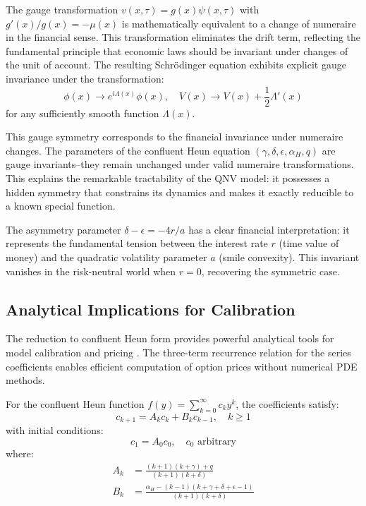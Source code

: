 \documentclass[a4paper,11pt]{article}
\begin{document}
The gauge transformation $v(x, \tau) = g(x)\psi(x, \tau)$ with $g'(x)/g(x) = -\mu(x)$ is mathematically equivalent to a change of numeraire in the financial sense. This transformation eliminates the drift term, reflecting the fundamental principle that economic laws should be invariant under changes of the unit of account. The resulting Schrödinger equation exhibits explicit gauge invariance under the transformation:
\begin{equation}
\phi(x) \rightarrow e^{i\Lambda(x)}\phi(x), \quad V(x) \rightarrow V(x) + \frac{1}{2}\Lambda'(x)
\end{equation}
for any sufficiently smooth function $\Lambda(x)$.

This gauge symmetry corresponds to the financial invariance under numeraire changes. The parameters of the confluent Heun equation $(\gamma, \delta, \epsilon, \alpha_H, q)$ are gauge invariants--they remain unchanged under valid numeraire transformations. This explains the remarkable tractability of the QNV model: it possesses a hidden symmetry that constrains its dynamics and makes it exactly reducible to a known special function.

The asymmetry parameter $\delta - \epsilon = -4r/a$ has a clear financial interpretation: it represents the fundamental tension between the interest rate $r$ (time value of money) and the quadratic volatility parameter $a$ (smile convexity). This invariant vanishes in the risk-neutral world when $r = 0$, recovering the symmetric case.

\subsection{Analytical Implications for Calibration}

The reduction to confluent Heun form provides powerful analytical tools for model calibration and pricing \cite{AlbaneseEtAl2001,Gatheral2006}. The three-term recurrence relation for the series coefficients enables efficient computation of option prices without numerical PDE methods.

For the confluent Heun function $f(y) = \sum_{k=0}^\infty c_k y^k$, the coefficients satisfy:
\begin{equation}
c_{k+1} = A_k c_k + B_k c_{k-1}, \quad k \geq 1
\end{equation}
with initial conditions:
\begin{equation}
c_1 = A_0 c_0, \quad c_0 \text{ arbitrary}
\end{equation}
where:
\begin{align}
A_k &= \frac{(k+1)(k+\gamma) + q}{(k+1)(k+\delta)} \\
B_k &= \frac{\alpha_H - (k-1)(k+\gamma+\delta+\epsilon-1)}{(k+1)(k+\delta)}
\end{align}
\end{document}
